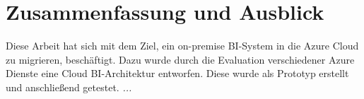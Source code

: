 \chapter{Zusammenfassung und Ausblick} \label{ch:zusammenfassung}
Diese Arbeit hat sich mit dem Ziel, ein on-premise BI-System in die Azure Cloud zu migrieren, beschäftigt. Dazu wurde durch die Evaluation verschiedener Azure Dienste eine Cloud BI-Architektur entworfen. Diese wurde als Prototyp erstellt und anschließend getestet.
\textit{...}